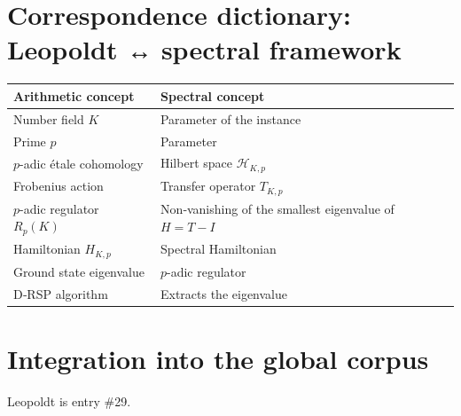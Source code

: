 \documentclass[11pt,a4paper]{article}
\begin{document}
\section{Correspondence dictionary: Leopoldt ↔ spectral framework}

\begin{center}
\small
\begin{tabular}{@{}l|l@{}}
\toprule
\textbf{Arithmetic concept} & \textbf{Spectral concept} \\
\midrule
Number field $K$ & Parameter of the instance \\
Prime $p$ & Parameter \\
$p$-adic étale cohomology & Hilbert space $\mathcal{H}_{K,p}$ \\
Frobenius action & Transfer operator $T_{K,p}$ \\
$p$-adic regulator $R_p(K)$ & Non‑vanishing of the smallest eigenvalue of $H = T - I$ \\
Hamiltonian $H_{K,p}$ & Spectral Hamiltonian \\
Ground state eigenvalue & $p$-adic regulator \\
D‑RSP algorithm & Extracts the eigenvalue \\
\bottomrule
\end{tabular}
\end{center}

\section{Integration into the global corpus}

Leopoldt is entry \#29.
\end{document}
